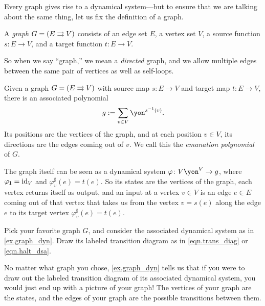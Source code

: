 \documentclass[Book-Poly]{subfiles}
\begin{document}
Every graph gives rise to a dynamical system---but to ensure that we are talking about the same thing, let us fix the definition of a graph.

\begin{definition}[Graph] \label{def.graph}
A \emph{graph} $G = (E \rightrightarrows V)$ consists of an edge set $E$, a vertex set $V$, a source function $s\colon E\to V$, and a target function $t\colon E\to V$.
\end{definition}

So when we say ``graph,'' we mean a \emph{directed} graph, and we allow multiple edges between the same pair of vertices as well as self-loops.

\begin{example} \label{ex.graph_dyn}
Given a graph $G = (E \rightrightarrows V)$ with source map $s \colon E \to V$ and target map $t \colon E \to V$, there is an associated polynomial
\[
    g := \sum_{v \in V} \yon^{s\inv(v)}.
\]
Its positions are the vertices of the graph, and at each position $v\in V$, its directions are the edges coming out of $v$.
We call this the \emph{emanation polynomial} of $G$.

The graph itself can be seen as a dynamical system $\varphi\colon V\yon^V \to g$, where $\varphi_{\textsf{1}} = \mathrm{id}_V$ and $\varphi^\sharp_v(e) = t(e)$.
So its states are the vertices of the graph, each vertex returns itself as output, and an input at a vertex $v\in V$ is an edge $e\in E$ coming out of that vertex that takes us from the vertex $v=s(e)$ along the edge $e$ to its target vertex $\varphi^\sharp_v(e)=t(e)$.
\end{example}

\begin{exercise}
Pick your favorite graph $G$, and consider the associated dynamical system as in \cref{ex.graph_dyn}.
Draw its labeled transition diagram as in \eqref{eqn.trans_diag} or \eqref{eqn.halt_dsa}.
\begin{solution}
No matter what graph you chose, \cref{ex.graph_dyn} tells us that if you were to draw out the labeled transition diagram of its associated dynamical system, you would just end up with a picture of your graph!
The vertices of your graph are the states, and the edges of your graph are the possible transitions between them.
\end{solution}
\end{exercise}

\end{document}
